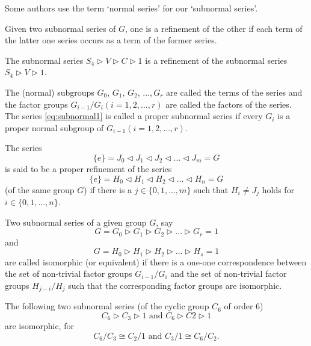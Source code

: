 \documentclass[../main-sheet.tex]{subfiles}
\begin{document}
\begin{note}
Some authors use the term `normal series' for our `subnormal series'.
\end{note}
\begin{defn}
    Given two subnormal series of \(G \), one is a refinement of the other if
    each term of the latter one series occurs as a term of the former series.
\end{defn}
\begin{ex}
The subnormal series \(S_4 \vartriangleright V \vartriangleright C \vartriangleright  1\)
 is a refinement of the subnormal series \(S_4 \vartriangleright  V \vartriangleright  1\).
\end{ex}
\begin{defn}
    The (normal) subgroups \(G_0\), \(G_1,\,G_2,\,\dots,G_r\) are called the terms of the series and the factor groups \(G_{i-1}/G_i (i=1,2,\dots,r )\) are called the factors of the series.
    The series \eqref{eq:subnormal1} is called  a proper subnormal series if every \(G_i \) is a proper normal subgroup of \(G_{i-1}(i=1,2,\dots,r )\).
\end{defn}
\begin{defn}
    The series
    \[\{e\} =J_0\vartriangleleft J_1 \vartriangleleft J_2 \vartriangleleft \dots \vartriangleleft J_m=G\]
    is said to be a proper refinement of the series
    \[\{e\} =H_0\vartriangleleft H_1 \vartriangleleft H_2 \vartriangleleft \dots \vartriangleleft H_n=G\]
    (of the same group \(G\)) if there is a \(j\in \{0,1,\dots, m\}\) such that \( H_i \neq J_j\) holds for \(i\in \{0,1,\dots, n\}\).
\end{defn}
\begin{defn}
    Two subnormal series of a given group \(G\), say
    \[G= G_0 \vartriangleright G_1\vartriangleright G_2\vartriangleright\dots \vartriangleright G_r = 1\]
    and
    \[G= H_0 \vartriangleright H_1\vartriangleright H_2\vartriangleright\dots \vartriangleright H_s = 1\]
    are called isomorphic (or equivalent) if there is a one-one correspondence between the
    set of non-trivial factor groups \(G_{i-1}/G_i \) and the set of non-trivial factor groups \(H_{j-i}/ H_j\)
    such that the corresponding factor groups are isomorphic.
\end{defn}
\begin{ex}
The following two subnormal series (of the cyclic group \(C_6\) of order 6)
\[C_6 \vartriangleright C_3 \vartriangleright 1 \text{ and } C_6 \vartriangleright C2 \vartriangleright 1\]
are isomorphic, for
\[C_6/C_3 \cong C_2/1 \text{ and } C_3/1 \cong C_6/C_2.\]
\end{ex}
\end{document}
